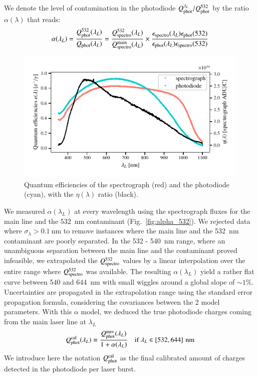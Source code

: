 
We denote the level of contamination in the photodiode $Q_{\mathrm{phot}}^{\lambda_L}/Q_{\mathrm{phot}}^{532}$ by the ratio $\alpha(\lambda)$ that reads:
\begin{equation}
    \alpha(\lambda_L) = \frac{Q_{\mathrm{phot}}^{532}(\lambda_L)}{Q_{\mathrm{phot}}(\lambda_L)} = \frac{Q_{\mathrm{spectro}}^{532}(\lambda_L)}{Q_{\mathrm{spectro}}^{\mathrm{main}}(\lambda_L)} \times \frac{\epsilon_{\mathrm{spectro}}(\lambda_L)\epsilon_{\mathrm{phot}}(532)}{\epsilon_{\mathrm{phot}}(\lambda_L)\epsilon_{\mathrm{spectro}}(532)} 
    \label{eq:alpha}
\end{equation}

\begin{figure}%
    \centering
    \includegraphics[width=\columnwidth]{fig/qe_phototiode_spectro.pdf}
    \caption{Quantum efficiencies of the spectrograph (red) and the photodiode (cyan), with the $\eta(\lambda)$ ratio (black).}
    \label{fig:QEs}
\end{figure}
    
We measured $\alpha(\lambda_L)$ at every wavelength using the spectrograph fluxes for the main line and the \SI{532}{nm} contaminant (Fig.~\ref{fig:alpha_532}). We rejected data where $\sigma_{\lambda} > \SI{0.1}{\nm}$ to remove instances where the main line and the \SI{532}{nm} contaminant are poorly separated. In the 532 - \SI{540}{nm} range, where an unambiguous separation between the main line and the contaminant proved infeasible, we extrapolated the $Q_{\mathrm{spectro}}^{532}$ values by a linear interpolation over the entire range where $Q_{\mathrm{spectro}}^{532}$ was available.
The resulting $\alpha(\lambda_L)$ yield a rather flat curve between 540 and \SI{644}{\nm} with small wiggles around a global slope of $\sim 1\% $.
Uncertainties are propagated in the extrapolation range using the standard error propagation formula, considering the covariances between the 2 model parameters. With this $\alpha$ model, we deduced the true photodiode charges coming from the main laser line at $\lambda_L$
\begin{equation}
        Q_{\mathrm{phot}}^{\mathrm{cal}}(\lambda_L) \equiv  \frac{Q_{\mathrm{phot}}^{\mathrm{mes}}(\lambda_L)}{1 + \alpha(\lambda_L)} \quad\text{if}\ \lambda_L \in \left[532, 644\right]\mathrm{\,nm}\label{eq:qphot_cal532}
\end{equation}
We introduce here the notation $Q_{\mathrm{phot}}^{\mathrm{cal}}$ as the final calibrated amount of charges detected in the photodiode per laser burst. 

